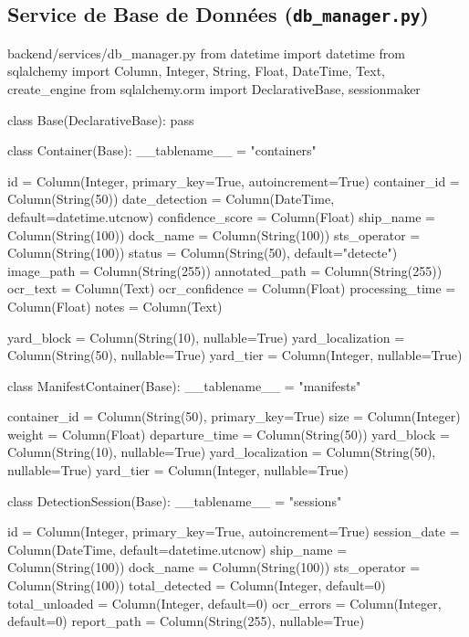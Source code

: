 \documentclass[12pt,a4paper]{article}
\begin{document}
\subsection{Service de Base de Données (\texttt{db\_manager.py})}
\begin{vscodeWindow}{backend/services/db\_manager.py}
from datetime import datetime
from sqlalchemy import Column, Integer, String, Float, DateTime, Text, create_engine
from sqlalchemy.orm import DeclarativeBase, sessionmaker

class Base(DeclarativeBase):
    pass

class Container(Base):
    __tablename__ = "containers"

    id               = Column(Integer, primary_key=True, autoincrement=True)
    container_id     = Column(String(50))
    date_detection   = Column(DateTime, default=datetime.utcnow)
    confidence_score = Column(Float)
    ship_name        = Column(String(100))
    dock_name        = Column(String(100))
    sts_operator     = Column(String(100))
    status           = Column(String(50), default="detecte")
    image_path       = Column(String(255))
    annotated_path   = Column(String(255))
    ocr_text         = Column(Text)
    ocr_confidence   = Column(Float)
    processing_time  = Column(Float)
    notes            = Column(Text)
    
    yard_block        = Column(String(10), nullable=True)
    yard_localization = Column(String(50), nullable=True)
    yard_tier         = Column(Integer, nullable=True)

class ManifestContainer(Base):
    __tablename__ = "manifests"

    container_id   = Column(String(50), primary_key=True)
    size           = Column(Integer)
    weight         = Column(Float)
    departure_time = Column(String(50))
    yard_block     = Column(String(10), nullable=True)
    yard_localization = Column(String(50), nullable=True)
    yard_tier      = Column(Integer, nullable=True)

class DetectionSession(Base):
    __tablename__ = "sessions"

    id             = Column(Integer, primary_key=True, autoincrement=True)
    session_date   = Column(DateTime, default=datetime.utcnow)
    ship_name      = Column(String(100))
    dock_name      = Column(String(100))
    sts_operator   = Column(String(100))
    total_detected = Column(Integer, default=0)
    total_unloaded = Column(Integer, default=0)
    ocr_errors     = Column(Integer, default=0)
    report_path    = Column(String(255), nullable=True)
\end{vscodeWindow}
\end{document}
